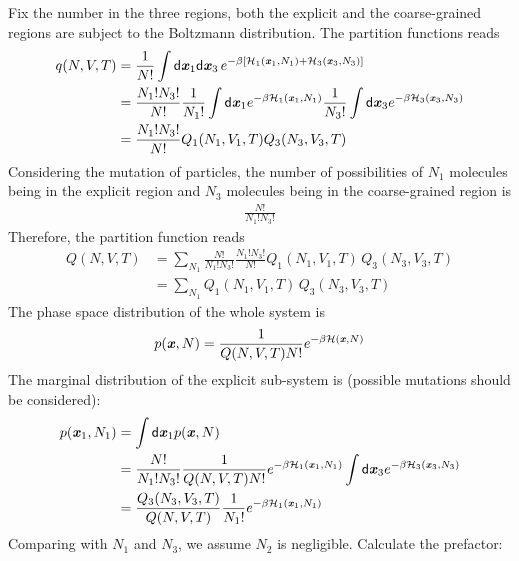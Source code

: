 \documentclass[aps,pre,preprint,unsortedaddress]{revtex4}
\renewcommand{\v}[1]{\textbf{\textit{#1}}}
\renewcommand{\d}[1]{\textsf{#1}}
\begin{document}
Fix the number in the three regions, both the explicit and the
coarse-grained regions are subject to the Boltzmann distribution. The
partition functions reads
\begin{align}\nonumber
  q(N,V,T)
  &= \frac1{N!}\int
  \d d\v x_1\d d\v x_3\,
  e^{-\beta
    [\mathcal H_1(\v x_1, N_1) + \mathcal H_3(\v x_3, N_3)]}\\\nonumber
  & = \frac{N_1!N_3!}{N!}
  \frac{1}{N_1!}\int\d d\v x_1 e^{-\beta\mathcal H_1(\v x_1, N_1)}
  \frac{1}{N_3!}\int\d d\v x_3 e^{-\beta\mathcal H_3(\v x_3, N_3)}\\
  & = \frac{N_1!N_3!}{N!}
  Q_1(N_1, V_1, T)
  Q_3(N_3, V_3, T) 
\end{align}
Considering the mutation of particles, the number of possibilities of
$N_1$ molecules being in the explicit region and $N_3$ molecules being
in the coarse-grained region is
\begin{align}
  \frac{N!}{N_1!N_3!}
\end{align}
Therefore, the partition function reads
\begin{align}\nonumber
  Q(N,V,T) &= \sum_{N_1}
  \frac{N!}{N_1!N_3!} \frac{N_1!N_3!}{N!}
  Q_1(N_1, V_1, T)\,
  Q_3(N_3, V_3, T) \\
  &= \sum_{N_1}
  Q_1(N_1, V_1, T)\,
  Q_3(N_3, V_3, T) 
\end{align}
The phase space distribution of the whole system is
\begin{align}
  p(\v x, N) = \frac{1}{Q(N,V,T) N!} e^{-\beta\mathcal H(\v x, N)}
\end{align}
The marginal distribution of the explicit sub-system is (possible
mutations should be considered):
\begin{align}\nonumber
  p(\v x_1, N_1)
  &=
  \int \d d\v x_1p(\v x, N)  \\ \nonumber
  &=
  \frac{N!}{N_1!N_3!}\frac{1}{Q(N,V,T) N!}
  e^{-\beta\mathcal H_1(\v x_1, N_1)}
  \int \d d\v x_3
  e^{-\beta\mathcal H_3(\v x_3, N_3)} \\
  & =
  \frac{Q_3(N_3,V_3,T)}{Q(N,V,T)}\frac{1}{N_1!} e^{-\beta\mathcal H_1(\v x_1, N_1)}
\end{align}
Comparing with $N_1$ and $N_3$, we assume $N_2$ is
negligible. Calculate the prefactor:
\end{document}
